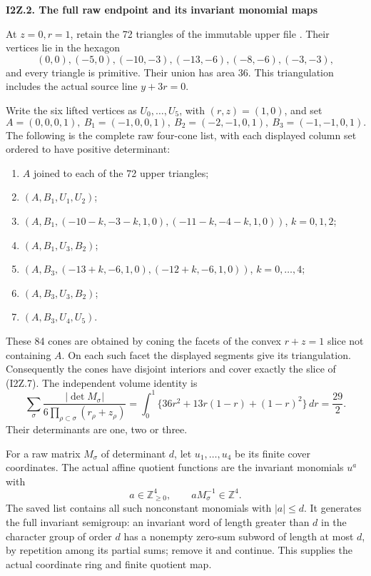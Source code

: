 \par

\medskip\noindent\textbf{I2Z.2. The full raw endpoint and its invariant monomial maps}

\par\nobreak

At \(z=0,r=1\), retain the 72 triangles of the immutable upper file
. Their vertices lie in the hexagon
\[
 (0,0),(-5,0),(-10,-3),(-13,-6),(-8,-6),(-3,-3),
 \tag{I2Z.9}
\]
and every triangle is primitive. Their union has area 36. This
triangulation includes the actual source line \(y+3r=0\).

Write the six lifted vertices as \(U_0,\ldots,U_5\), with
\((r,z)=(1,0)\), and set
\[
 A=(0,0,0,1),\ B_1=(-1,0,0,1),\
 B_2=(-2,-1,0,1),\ B_3=(-1,-1,0,1).
 \tag{I2Z.10}
\]
The following is the complete raw four-cone list, with each displayed
column set ordered to have positive determinant:

\begin{enumerate}
\def\labelenumi{\arabic{enumi}.}

\item
  \(A\) joined to each of the 72 upper triangles;
\item
  \((A,B_1,U_1,U_2)\);
\item
  \((A,B_1,(-10-k,-3-k,1,0),(-11-k,-4-k,1,0))\),
  \(k=0,1,2\);
\item
  \((A,B_1,U_3,B_2)\);
\item
  \((A,B_3,(-13+k,-6,1,0),(-12+k,-6,1,0))\),
  \(k=0,\ldots,4\);
\item
  \((A,B_3,U_3,B_2)\);
\item
  \((A,B_3,U_4,U_5)\).
\end{enumerate}

These 84 cones are obtained by coning the facets of the convex
\(r+z=1\) slice not containing \(A\). On each such facet the displayed
segments give its triangulation. Consequently the cones have disjoint
interiors and cover exactly the slice of (I2Z.7). The independent volume
identity is
\[
 \sum_\sigma\frac{|\det M_\sigma|}
 {6\prod_{\rho\subset\sigma}(r_\rho+z_\rho)}
 =\int_0^1\{36r^2+13r(1-r)+(1-r)^2\}\,dr
 =\frac{29}{2}.
 \tag{I2Z.11}
\]
Their determinants are one, two or three.

For a raw matrix \(M_\sigma\) of determinant \(d\), let \(u_1,\ldots,u_4\)
be its finite cover coordinates. The actual affine quotient functions
are the invariant monomials \(u^a\) with
\[
 a\in\mathbb Z_{\ge0}^4,\qquad aM_\sigma^{-1}\in\mathbb Z^4.
 \tag{I2Z.12}
\]
The saved list contains all such nonconstant monomials with
\(|a|\le d\). It generates the full invariant semigroup: an invariant
word of length greater than \(d\) in the character group of order \(d\)
has a nonempty zero-sum subword of length at most \(d\), by repetition
among its partial sums; remove it and continue. This supplies the
actual coordinate ring and finite quotient map.

